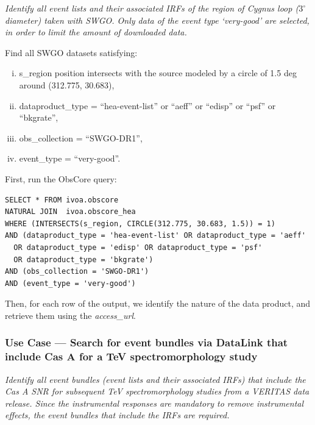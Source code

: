 {\em Identify all event lists and their associated \glspl{IRF} of the region of Cygnus loop ($3^{\circ}$ diameter) taken with SWGO. Only data of the event type `very-good' are selected, in order to limit the amount of downloaded data.\/}

\medskip
\noindent Find all SWGO datasets satisfying:
\begin{enumerate}[(i)]
  \item s\_region position intersects with the source modeled by a circle of 1.5 deg around (312.775, 30.683),
  \item dataproduct\_type = ``hea-event-list'' or ``aeff'' or ``edisp'' or ``psf'' or ``bkgrate'',
  \item obs\_collection = ``SWGO-DR1'',
  \item event\_type = ``very-good''.
\end{enumerate}

First, run the ObsCore query:
\begin{verbatim}
SELECT * FROM ivoa.obscore
NATURAL JOIN  ivoa.obscore_hea
WHERE (INTERSECTS(s_region, CIRCLE(312.775, 30.683, 1.5)) = 1)
AND (dataproduct_type = 'hea-event-list' OR dataproduct_type = 'aeff'
  OR dataproduct_type = 'edisp' OR dataproduct_type = 'psf'
  OR dataproduct_type = 'bkgrate')
AND (obs_collection = 'SWGO-DR1')
AND (event_type = 'very-good')
\end{verbatim}

Then, for each row of the output, we identify the nature of the data product, and retrieve them using the {\em access\_url\/}.

\subsubsection{Use Case --- Search for event bundles via DataLink that include Cas A for a TeV spectromorphology study}

{\em Identify all event bundles (event lists and their associated \glspl{IRF}) that include the Cas A SNR for subsequent TeV spectromorphology studies from a VERITAS data release. Since the instrumental responses are mandatory to remove instrumental effects, the event bundles that include the  \glspl{IRF} are required.\/}



